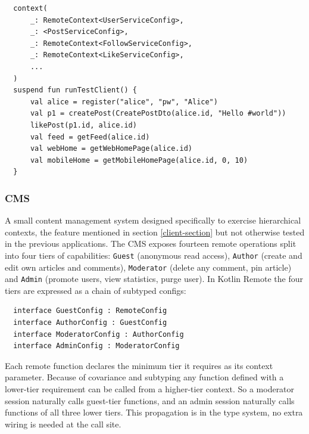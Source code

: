 \documentclass[a4paper,11pt,oneside]{article}
\newcommand{\kotlini}[1]{\texttt{#1}}
\begin{document}
\begin{listing}[!h]
  \begin{verbatim}
  context(
      _: RemoteContext<UserServiceConfig>, 
      _: <PostServiceConfig>,
      _: RemoteContext<FollowServiceConfig>, 
      _: RemoteContext<LikeServiceConfig>,
      ...
  )
  suspend fun runTestClient() {
      val alice = register("alice", "pw", "Alice")
      val p1 = createPost(CreatePostDto(alice.id, "Hello #world"))
      likePost(p1.id, alice.id)
      val feed = getFeed(alice.id)
      val webHome = getWebHomePage(alice.id)
      val mobileHome = getMobileHomePage(alice.id, 0, 10)
  }
  \end{verbatim}
  \caption{Multi-context client function in social platform}\label{social_client}
\end{listing}

\subsubsection{CMS} \label{cms_app_section}

A small content management system designed specifically to exercise hierarchical contexts, the
feature mentioned in section \ref{client-section} but not otherwise tested in the previous
applications. The CMS exposes fourteen remote operations split into four tiers of capabilities:
\kotlini{Guest} (anonymous read access), \kotlini{Author} (create and edit own articles and
comments), \kotlini{Moderator} (delete any comment, pin article) and \kotlini{Admin} (promote
users, view statistics, purge user). In Kotlin Remote the four tiers are expressed as a chain
of subtyped configs:

\begin{listing}[!h]
  \begin{verbatim}
  interface GuestConfig : RemoteConfig
  interface AuthorConfig : GuestConfig
  interface ModeratorConfig : AuthorConfig
  interface AdminConfig : ModeratorConfig
  \end{verbatim}
  \caption{Four-tier context hierarchy in CMS}\label{cms_hierarchy}
\end{listing}

Each remote function declares the minimum tier it requires as its context parameter. Because
of covariance and subtyping any function defined with a lower-tier requirement can be called
from a higher-tier context. So a moderator session naturally calls guest-tier functions, and
an admin session naturally calls functions of all three lower tiers. This propagation is in
the type system, no extra wiring is needed at the call site.
\end{document}
